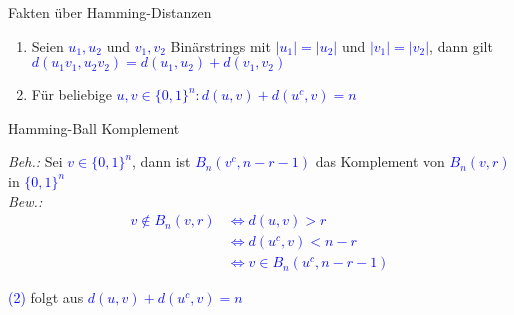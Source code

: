 \documentclass[10pt, aspectratio=169]{beamer}
\begin{document}
\begin{frame}[label={fakt}]{Fakten über Hamming-Distanzen}
\addtocounter{framenumber}{-1}

\begin{enumerate}
    \item Seien \textcolor{blue}{$u_1, u_2$} und \textcolor{blue}{$v_1, v_2$} Binärstrings mit \textcolor{blue}{$|u_1| = |u_2|$} und \textcolor{blue}{$|v_1| = |v_2|$}, dann gilt 
   \textcolor{blue}{ $d(u_1v_1, u_2v_2) = d(u_1,u_2) + d(v_1, v_2)$}

   \item {Für beliebige \textcolor{blue}{$u,v\in\{0,1\}^n: d(u,v) + d(u^c,v) = n$}}
   
\end{enumerate}
\end{frame}
\begin{frame}[label ={Kompl}]{Hamming-Ball Komplement}
\addtocounter{framenumber}{-1}
\textit{Beh.: }Sei \textcolor{blue}{$v \in \{0,1\}^n$}, dann ist \textcolor{blue}{$B_n(v^c,n-r-1)$} das Komplement von \textcolor{blue}{$B_n(v,r)$} in \textcolor{blue}{$\{0,1\}^n$}\\

\textit{Bew.: }\textcolor{blue}{
\begin{align}
v \not \in B_n(v,r) &\Leftrightarrow d(u,v) > r\\
 &\Leftrightarrow d(u^c,v) < n-r\\
  &\Leftrightarrow v \in B_n(u^c, n-r-1)
\end{align}}

\textcolor{blue}{(2)} folgt aus \textcolor{blue}{$d(u,v)+d(u^c,v) = n$}
\end{frame}
\end{document}
